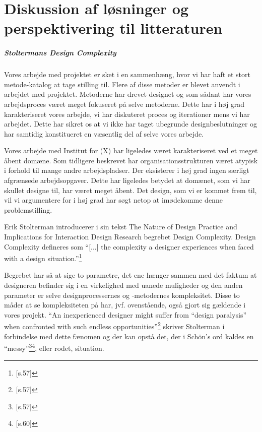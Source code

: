 \chapter{Diskussion af løsninger og perspektivering til litteraturen}

\paragraph{Stoltermans Design Complexity}
Vores arbejde med projektet er sket i en sammenhæng, hvor vi har haft et stort metode-katalog at tage stilling til. Flere af disse metoder er blevet anvendt i arbejdet med projektet. Metoderne har drevet designet og som sådant har vores arbejdsproces været meget fokuseret på selve metoderne. Dette har i høj grad karakteriseret vores arbejde, vi har diskuteret proces og iterationer mens vi har arbejdet. Dette har sikret os at vi ikke har taget ubegrunde designbeslutninger og har samtidig konstitueret en væsentlig del af selve vores arbejde.

Vores arbejde med Institut for (X) har ligeledes været karakteriseret ved et meget åbent domæne. Som tidligere beskrevet har organisationsstrukturen været atypisk i forhold til mange andre arbejdspladser. Der eksisterer i høj grad ingen særligt afgrænsede arbejdsopgaver. Dette har ligeledes betydet at domænet, som vi har skullet designe til, har været meget åbent. Det design, som vi er kommet frem til, vil vi argumentere for i høj grad har søgt netop at imødekomme denne problemstilling.

Erik Stolterman introducerer i sin tekst The Nature of Design Practice and Implications
for Interaction Design Research begrebet Design Complexity. Design Complexity defineres som “[...] the complexity a designer experiences when faced with a design situation.”\footnote{\citep{Stolterman}[s.57]}

Begrebet har så at sige to parametre, det ene hænger sammen med det faktum at designeren befinder sig i en virkelighed med uanede muligheder og den anden parameter er selve designprocessernes og -metodernes kompleksitet. Disse to måder at se kompleksiteten på har, jvf. ovenstående, også gjort sig gældende i vores projekt. “An inexperienced designer might suffer from “design paralysis” when confronted with such endless opportunities”\footnote{\citep{Stolterman}[s.57]} skriver Stolterman i forbindelse med dette fænomen og der kan opstå det, der i Schön’s ord kaldes en “messy”\footnote{\citep{Stolterman}[s.57]}\footnote{\citep{Stolterman}[s.60]}, eller rodet, situation.

